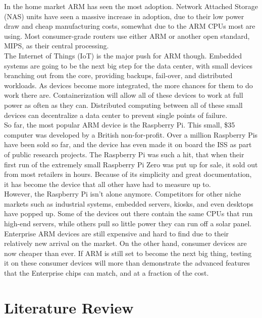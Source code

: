 \documentclass[12pt]{spieman}  %
\begin{document}
In the home market ARM has seen the most adoption. Network Attached Storage (NAS) units have seen a massive increase in adoption, due to their low power draw and cheap manufacturing costs, somewhat due to the ARM CPUs most are using. Most consumer-grade routers use either ARM or another open standard, MIPS, as their central processing.\\

The Internet of Things (IoT) is the major push for ARM though. Embedded systems are going to be the next big step for the data center, with small devices branching out from the core, providing backups, fail-over, and distributed workloads. As devices become more integrated, the more chances for them to do work there are. Containerization will allow all of these devices to work at full power as often as they can. Distributed computing between all of these small devices can decentralize a data center to prevent single points of failure.\\

So far, the most popular ARM device is the Raspberry Pi. This small, \$35 computer was developed by a British non-for-profit. Over a million Raspberry Pis have been sold so far, and the device has even made it on board the ISS as part of public research projects. The Raspberry Pi was such a hit, that when their first run of the extremely small Raspberry Pi Zero was put up for sale, it sold out from most retailers in hours. Because of its simplicity and great documentation, it has become the device that all other have had to measure up to.\\

However, the Raspberry Pi isn’t alone anymore. Competitors for other niche markets such as industrial systems, embedded servers, kiosks, and even desktops have popped up. Some of the devices out there contain the same CPUs that run high-end servers, while others pull so little power they can run off a solar panel.\\

Enterprise ARM devices are still expensive and hard to find due to their relatively new arrival on the market. On the other hand, consumer devices are now cheaper than ever. If ARM is still set to become the next big thing, testing it on these consumer devices will more than demonstrate the advanced features that the Enterprise chips can match, and at a fraction of the cost.\\

\section{Literature Review}
\label{sec:lit-rev}
\end{document}
